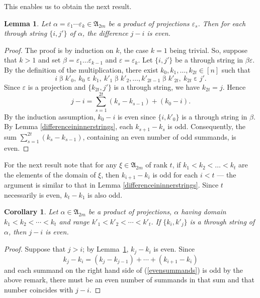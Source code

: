 \documentclass[preprint,1p,times]{elsarticle}
\numberwithin{equation}{section}
\newtheorem{Lemma}[Thm]{Lemma}
\newtheorem{Cor}[Thm]{Corollary}
\theoremstyle{remark}
\def\al{\alpha}
\def\ep{\varepsilon}
\def\be{\beta}
\def\A{\mathfrak{A}}
\begin{document}
This enables us to obtain the next result.

\begin{Lemma}\label{differenceinthroughstrings}
Let $\al=\ep_1\cdots \ep_k\in\A_{2m}$ be a product of projections $\ep_s$. Then for each through string $\{i,j'\}$ of
$\al$, the difference $j-i$ is even.
\end{Lemma}

\begin{proof}
The proof is by induction on $k$, the case $k=1$ being trivial. So, suppose that $k>1$ and set
$\be=\ep_1\dots\ep_{k-1}$ and $\ep=\ep_k$. Let $\{i,j'\}$ be a through string in $\be\ep$. By the definition of the
multiplication, there exist $k_0,k_1,\dots,k_{2t}\in [n]$ such that
$$i\mathrel{\be}k'_0,\ k_0\mathrel{\ep} k_1,\ k'_1\mathrel{\be}
k'_2,\dots ,k'_{2t-1}\mathrel{\be}k'_{2t},\ k_{2t}\mathrel{\ep}j'.$$ Since $\ep$ is a projection and $\{k_{2t},j'\}$ is
a through string, we have $k_{2t}=j$. Hence
$$j-i=\sum_{s=1}^{2t}(k_s-k_{s-1})+(k_0-i).$$
By the induction assumption, $k_0-i$ is even since $\{i,k'_0\}$ is a through string in $\be$. By Lemma
\ref{differenceininnerstrings}, each $k_{s+1}-k_s$ is odd. Consequently, the sum $\sum_{s=1}^{2t}(k_{s}-k_{s-1})$,
containing an even number of odd summands, is even.
\end{proof}

For the next result note that for any $\xi\in\A_{2m}$ of rank $t$, if $k_1<k_2<\dots<k_t$ are the elements of the
domain of $\xi$, then $k_{i+1}-k_i$ is odd for each $i<t$ --- the argument is similar to that in Lemma
\ref{differenceininnerstrings}. Since $t$ necessarily is even, $k_t-k_1$ is also odd.

\begin{Cor}\label{differenceinindices}
Let $\al\in\A_{2m}$ be a product of projections, $\al$ having domain $k_1<k_2<\cdots<k_t$ and range
$k'_1<k'_2<\cdots<k'_t$. If $\{k_i,k'_j\}$ is a through string of $\al$, then $j-i$ is even.
\end{Cor}

\begin{proof}
Suppose that $j>i$; by Lemma~\ref{differenceinthroughstrings}, $k_j-k_i$ is even. Since
\begin{equation}\label{evensummands}
k_j-k_i=(k_j-k_{j-1})+\cdots+(k_{i+1}-k_i)
\end{equation}
and each summand on the right hand side of (\ref{evensummands}) is odd by the above remark, there must be an even
number of summands in that sum and that number coincides with $j-i$.
\end{proof}
\end{document}

